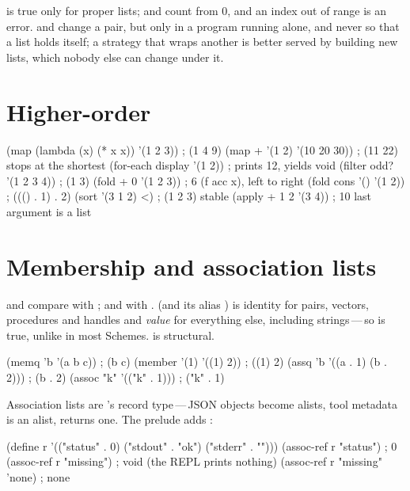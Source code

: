  is true only for proper lists;  and
 count from 0, and an index out of range is an error.
 and  change a pair, but only in a program
running alone, and never so that a list holds itself; a strategy that wraps
another is better served by building new lists, which nobody else can
change under it.

\section{Higher-order}

\begin{scm}
(map (lambda (x) (* x x)) '(1 2 3))        ; (1 4 9)
(map + '(1 2) '(10 20 30))                 ; (11 22)   stops at the shortest
(for-each display '(1 2))                  ; prints 12, yields void
(filter odd? '(1 2 3 4))                   ; (1 3)
(fold + 0 '(1 2 3))                        ; 6         (f acc x), left to right
(fold cons '() '(1 2))                     ; ((() . 1) . 2)
(sort '(3 1 2) <)                          ; (1 2 3)   stable
(apply + 1 2 '(3 4))                       ; 10        last argument is a list
\end{scm}

\section{Membership and association lists}

 and  compare with ;  and
 with .  (and its alias ) is
identity for pairs, vectors, procedures and handles and \emph{value} for
everything else, including strings\,---\,so  is true,
unlike in most Schemes.  is structural.

\begin{scm}
(memq 'b '(a b c))                   ; (b c)
(member '(1) '((1) 2))               ; ((1) 2)
(assq 'b '((a . 1) (b . 2)))         ; (b . 2)
(assoc "k" '(("k" . 1)))             ; ("k" . 1)
\end{scm}

Association lists are \nodwyn's record type\,---\,JSON objects become alists,
tool metadata is an alist,  returns one. The prelude adds
:

\begin{scm}
(define r '(("status" . 0) ("stdout" . "ok\n") ("stderr" . "")))
(assoc-ref r "status")          ; 0
(assoc-ref r "missing")         ; void (the REPL prints nothing)
(assoc-ref r "missing" 'none)   ; none
\end{scm}

